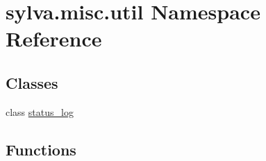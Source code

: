 \hypertarget{namespacesylva_1_1misc_1_1util}{}\section{sylva.\+misc.\+util Namespace Reference}
\label{namespacesylva_1_1misc_1_1util}
\subsection*{Classes}
\begin{DoxyCompactItemize}
\item 
class \hyperlink{classsylva_1_1misc_1_1util_1_1status__log}{status\+\_\+log}
\end{DoxyCompactItemize}
\subsection*{Functions}
